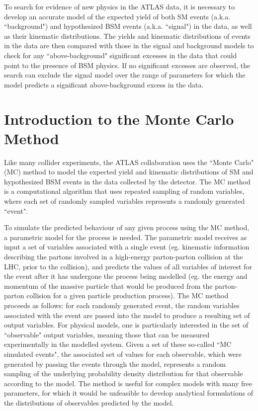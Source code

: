 \label{chapter:mc}

To search for evidence of new physics in the ATLAS data, it is necessary to develop an accurate model of the expected yield of both SM events (a.k.a. ``background") and hypothesized BSM events (a.k.a. ``signal") in the data, as well as their kinematic distributions. The yields and kinematic distributions of events in the data are then compared with those in the signal and background models to check for any ``above-background" significant excesses in the data that could point to the presence of BSM physics. If no significant excesses are observed, the search can exclude the signal model over the range of parameters for which the model predicts a significant above-background excess in the data.

\section{Introduction to the Monte Carlo Method}
\label{sec:mc_intro}

Like many collider experiments, the ATLAS collaboration uses the ``Monte Carlo" (MC) method to model the expected yield and kinematic distributions of SM and hypothesized BSM events in the data collected by the detector. The MC method is a computational algorithm that uses repeated sampling of random variables, where each set of randomly sampled variables represents a randomly generated ``event". 

To simulate the predicted behaviour of any given process using the MC method, a parametric model for the process is needed. The parametric model receives as input a set of variables associated with a single event (eg. kinematic information describing the partons involved in a high-energy parton-parton collision at the LHC, prior to the collision), and predicts the values of all variables of interest for the event after it has undergone the process being modelled (eg. the energy and momentum of the massive particle that would be produced from the parton-parton collision for a given particle production process). The MC method proceeds as follows: for each randomly generated event, the random variables associated with the event are passed into the model to produce a resulting set of output variables. For physical models, one is particularly interested in the set of ``observable" output variables, meaning those that can be measured experimentally in the modelled system. Given a set of these so-called ``MC simulated events", the associated set of values for each observable, which were generated by passing the events through the model, represents a random sampling of the underlying probability density distribution for that observable according to the model.  The method is useful for complex models with many free parameters, for which it would be unfeasible to develop analytical formulations of the distributions of observables predicted by the model.

